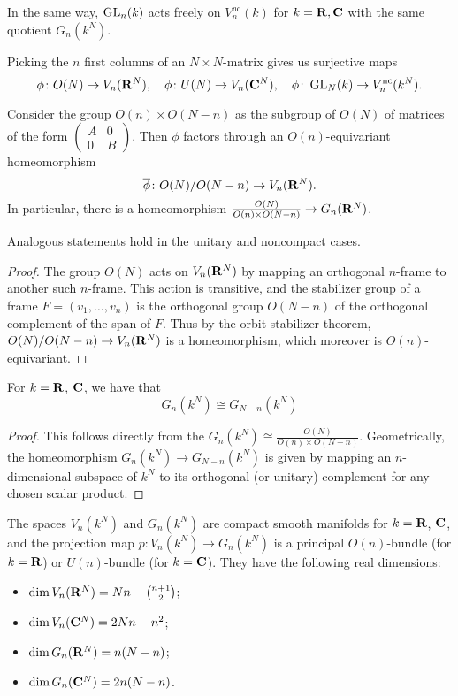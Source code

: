 \documentclass[a4paper,openany]{scrbook}
\begin{document}
\begin{remark}
In the same way, $\operatorname{GL}_n(k)$ acts freely on $V_n^{\operatorname{nc}}(k)$ for $k=\mathbf R,\mathbf C$ with the same quotient $G_n(k^N)$.
\end{remark}

Picking the $n$ first columns of an $N\times N$-matrix gives us surjective maps
\[
\phi\colon O(N) \to V_n(\mathbf R^N), \quad \phi\colon U(N) \to V_n(\mathbf C^N), \quad \phi\colon \operatorname{GL}_N(k) \to V_n^{\operatorname{nc}}(k^N).
\]

\begin{lemma}\label{lemma:grassstiefelashomogeneousspaces}
Consider the group $O(n) \times O(N-n)$ as the subgroup of $O(N)$ of matrices of the form $\left(\begin{smallmatrix} A & 0\\ 0 & B\end{smallmatrix}\right)$. Then $\phi$ factors through an $O(n)$-equivariant homeomorphism
\[
\overline\phi\colon O(N)/O(N-n) \to V_n(\mathbf R^N).
\]
In particular, there is a homeomorphism $\frac{O(N)}{O(n)\times O(N-n)} \to G_n(\mathbf R^N)$.

Analogous statements hold in the unitary and noncompact cases.
\end{lemma}
\begin{proof}
The group $O(N)$ acts on $V_n(\mathbf R^N)$ by mapping an orthogonal $n$-frame to another such $n$-frame. This action is transitive, and the stabilizer group of a frame $F=(v_1,\dots,v_n)$ is the orthogonal group $O(N-n)$ of the orthogonal complement of the span of $F$. Thus by the orbit-stabilizer theorem, $O(N)/O(N-n) \to V_n(\mathbf R^N)$ is a homeomorphism, which moreover is $O(n)$-equivariant.
\end{proof}


\begin{corollary}
For $k=\mathbf R$, $\mathbf C$, we have that
\[
G_n(k^N) \cong G_{N-n}(k^N)
\]
\end{corollary}
\begin{proof}
This follows directly from the $G_n(k^N) \cong \frac{O(N)}{O(n) \times O(N-n)}$. Geometrically, the homeomorphism $G_n(k^N) \to G_{N-n}(k^N)$ is given by mapping an $n$-dimensional subspace of $k^N$ to its orthogonal (or unitary) complement for any chosen scalar product.
\end{proof}



\begin{corollary} \label{cor:stiefelgrassmannbundle}\label{thm:grassmannianmanifolds}
The spaces $V_n(k^N)$ and $G_n(k^N)$ are compact smooth manifolds for $k=\mathbf R$, $\mathbf C$, and the projection map $p\colon V_n(k^N) \to G_n(k^N)$ is a principal $O(n)$-bundle (for $k=\mathbf R$) or $U(n)$-bundle (for $k=\mathbf C$). They have the following real dimensions:
\begin{itemize}
\item $\dim V_n(\mathbf R^N) = Nn - {n+1 \choose 2}$;
\item $\dim V_n(\mathbf C^N) = 2Nn - n^2$;
\item $\dim G_n(\mathbf R^N) = n(N-n)$;
\item $\dim G_n(\mathbf C^N) = 2n(N-n)$.
\end{itemize}
\end{corollary}
\end{document}
